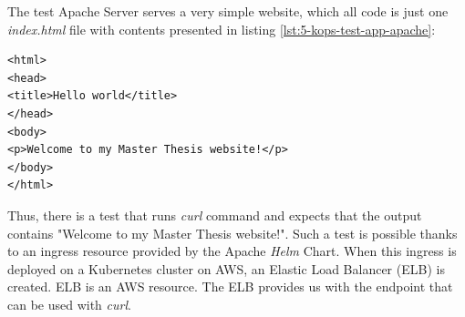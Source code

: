 The test Apache Server serves a very simple website, which all code is just one \textit{index.html} file with contents presented in listing \ref{lst:5-kops-test-app-apache}:
\begin{lstlisting}[basicstyle=\scriptsize,xleftmargin=0cm,label=lst:5-kops-test-app-apache,caption={Contents of a test application - Apache web server}]
<html>
<head>
<title>Hello world</title>
</head>
<body>
<p>Welcome to my Master Thesis website!</p>
</body>
</html>
\end{lstlisting}
Thus, there is a test that runs \textit{curl} command and expects that the output contains "Welcome to my Master Thesis website!". Such a test is possible thanks to an ingress resource provided by the Apache \textit{Helm} Chart. When this ingress is deployed on a Kubernetes cluster on AWS, an Elastic Load Balancer (ELB) is created. ELB is an AWS resource. The ELB provides us with the endpoint that can be used with \textit{curl}.

